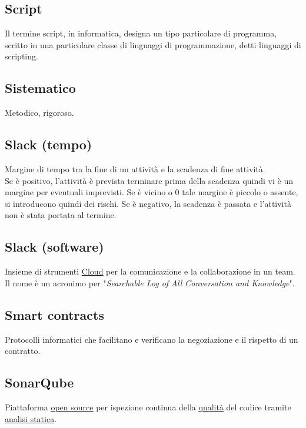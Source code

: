 	\subsection{Script}
	\label{sec:script}
	Il termine script, in informatica, designa un tipo particolare di programma, scritto in una particolare classe di linguaggi di programmazione, detti linguaggi di scripting.

	\subsection{Sistematico}
	\label{sec:sistematico}
	Metodico, rigoroso.

	\subsection{Slack (tempo)}
	\label{sec:slackt}
	Margine di tempo tra la fine di un attività e la scadenza di fine attività. \\
	Se è positivo, l'attività è prevista terminare prima della scadenza quindi vi è un margine per eventuali imprevisti. Se è vicino o 0 tale margine è piccolo o assente, si introducono quindi dei rischi. Se è negativo, la scadenza è passata e l'attività non è stata portata al termine.

	\subsection{Slack (software)}
	\label{sec:slacks}
	Insieme di strumenti \underline{\hyperref[sec:cloud]{Cloud}} per la comunicazione e la collaborazione in un team. Il nome è un acronimo per "\emph{Searchable Log of All Conversation and Knowledge}".

	\subsection{Smart contracts}
	\label{sec:smartcontracts}
    Protocolli informatici che facilitano e verificano la negoziazione e il rispetto di un contratto.

	\subsection{SonarQube}
	\label{sec:sonarqube}
	Piattaforma \underline{\hyperref[sec:opensource]{open source}} per ispezione continua della \underline{\hyperref[sec:qualita]{qualità}} del codice tramite \underline{\hyperref[sec:analisistatica]{analisi statica}}.

